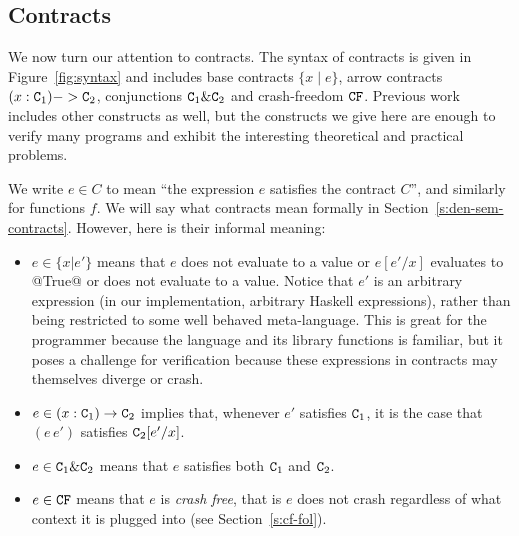 \subsection{Contracts}


We now turn our attention to contracts. The syntax of contracts
is given in Figure~\ref{fig:syntax} and includes base contracts
$\{ x \mid e \}$, arrow contracts $(x : {\tt C}_1) -> {\tt C}_2$, conjunctions
${\tt C}_1 \& {\tt C}_2$ and crash-freedom ${\tt CF}$. Previous work~\cite{xu+:contracts}
includes other constructs as well, but the constructs we give here are enough to verify
many programs and exhibit the interesting theoretical and practical problems.

We write $e \in C$ to mean ``the expression $e$ satisfies the contract $C$'', and similarly
for functions $f$.  We will say what contracts mean formally in
Section~\ref{s:den-sem-contracts}.  However, here is their informal meaning:
\begin{itemize}
\item $e \in \{x | e'\}$ means that $e$ does not evaluate to a value
  or $e[e'/x]$ evaluates to @True@ or does not evaluate to a value.
Notice that $e'$ is an arbitrary expression
(in our implementation, arbitrary Haskell expressions),
rather than being restricted to some well behaved meta-language.  This
is great for the programmer because the language and its library
functions is familiar, but it poses a challenge for verification
because these expressions in contracts may themselves diverge or
crash.
\item $e \in (x:{\tt C}_1) \rightarrow {\tt C}_2$ implies that, whenever $e'$ satisfies ${\tt C}_1$, it
is the case that $(e\,e')$ satisfies ${\tt C}_2[e'/x]$.
\item $e \in {\tt C}_1 \& {\tt C}_2$ means that $e$ satisfies both ${\tt C}_1$ and ${\tt C}_2$.
\item $e \in {\tt CF}$ means that $e$ is \emph{crash free}, that is $e$ does not
crash regardless of what context it is plugged into (see Section~\ref{s:cf-fol}).
\end{itemize}

